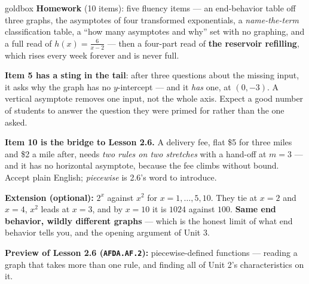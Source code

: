 \documentclass[10pt]{article}
\begin{document}
\boxguard[18]
\begin{skillbox}{goldbox}
\textbf{Homework} (10 items): five fluency items --- an end-behavior table off three graphs, the
asymptotes of four transformed exponentials, a \emph{name-the-term} classification table, a ``how
many asymptotes and why'' set with no graphing, and a full read of $h(x)=\frac{6}{x-2}$ --- then a
four-part read of \textbf{the reservoir refilling}, which rises every week forever and is never full.

\textbf{Item 5 has a sting in the tail}: after three questions about the missing input, it asks why
the graph has no $y$-intercept --- and it \emph{has} one, at $(0,-3)$. A vertical asymptote removes
one input, not the whole axis. Expect a good number of students to answer the question they were
primed for rather than the one asked.

\textbf{Item 10 is the bridge to Lesson 2.6.} A delivery fee, flat \$5 for three miles and \$2 a mile
after, needs \emph{two rules on two stretches} with a hand-off at $m=3$ --- and it has no horizontal
asymptote, because the fee climbs without bound. Accept plain English; \emph{piecewise} is 2.6's word
to introduce.

\textbf{Extension (optional):} $2^x$ against $x^2$ for $x=1,\dots,5,10$. They tie at $x=2$ and $x=4$,
$x^2$ leads at $x=3$, and by $x=10$ it is $1024$ against $100$. \textbf{Same end behavior, wildly
different graphs} --- which is the honest limit of what end behavior tells you, and the opening
argument of Unit 3.

\textbf{Preview of Lesson 2.6 (\texttt{AFDA.AF.2}):} piecewise-defined functions --- reading a graph
that takes more than one rule, and finding all of Unit 2's characteristics on it.
\end{skillbox}
\end{document}
